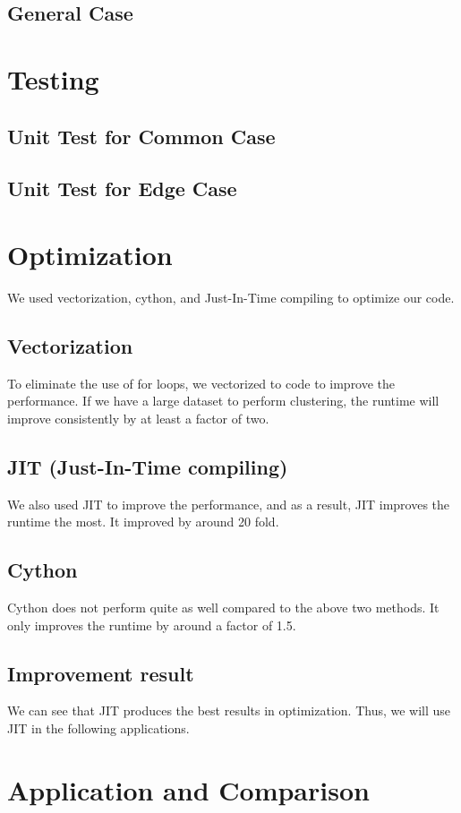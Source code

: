 \documentclass[11pt]{article}
\begin{document}
\subsection{General Case}


\section{Testing}
\subsection{Unit  Test for Common Case}
\subsection{Unit Test for Edge Case}

\section{Optimization}
We used vectorization, cython, and Just-In-Time compiling to optimize our code.
\subsection{Vectorization}
To eliminate the use of for loops, we vectorized to code to improve the performance. If we have a large dataset to perform clustering, the runtime will improve consistently by at least a factor of two.
\subsection{JIT (Just-In-Time compiling) }
We also used JIT to improve the performance, and as a result, JIT improves the runtime the most. It improved by around 20 fold.
\subsection{Cython}
Cython does not perform quite as well compared to the above two methods. It only improves the runtime by around a factor of 1.5.

\subsection{Improvement result}
We can see that JIT produces the best results in optimization. Thus, we will use JIT in the following applications.

\section{Application and Comparison}
\end{document}
